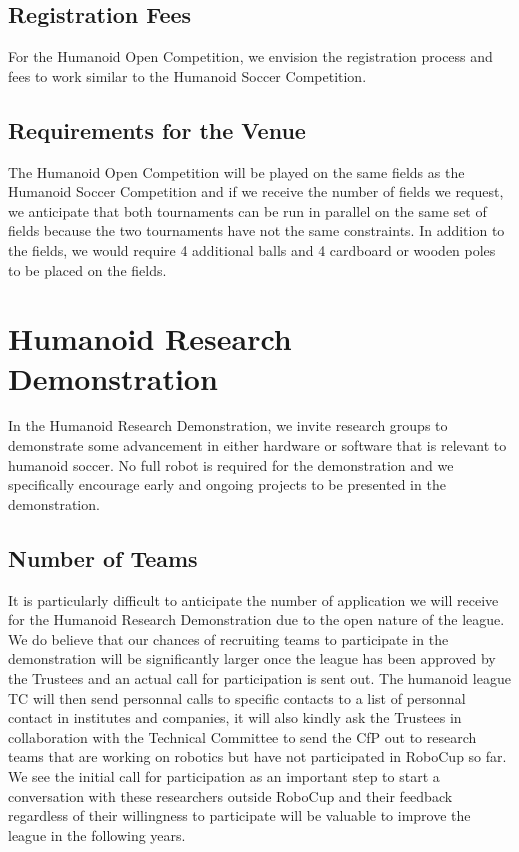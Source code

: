 \documentclass{article}
\begin{document}
\subsection{Registration Fees}

For the Humanoid Open Competition,
we envision the registration process and fees to work similar to the Humanoid
Soccer Competition.

\subsection{Requirements for the Venue}
The Humanoid Open Competition will be played on the same fields as the Humanoid
Soccer Competition and if we receive the number of fields we request,
we anticipate that both tournaments can be run in parallel on the same set of
fields because the two tournaments have not the same constraints.
In addition to the fields, we would require 4 additional balls and 4 cardboard or wooden poles to be placed on the fields. 

\section{Humanoid Research Demonstration}
In the Humanoid Research Demonstration, we invite research groups to demonstrate some advancement in either hardware or software that is relevant to humanoid soccer. No full robot is required for the demonstration and we specifically encourage early and ongoing projects to be presented in the demonstration.

\subsection{Number of Teams}

It is particularly difficult to anticipate the number of application we will
receive for the Humanoid Research Demonstration due to the open nature of the
league.
We do believe that our chances of recruiting teams to participate in the
demonstration will be significantly larger once the league has been approved by
the Trustees and an actual call for participation is sent out.
The humanoid league TC will then send personnal calls to specific contacts to a
list of personnal contact in institutes and companies,
it will also kindly ask the Trustees in collaboration with the Technical
Committee to send the CfP out to research teams that are working on robotics
but have not participated in RoboCup so far.
We see the initial call for participation as an important step to start a
conversation with these researchers outside RoboCup and their feedback
regardless of their willingness to participate will be valuable to improve the
league in the following years. 
\end{document}
